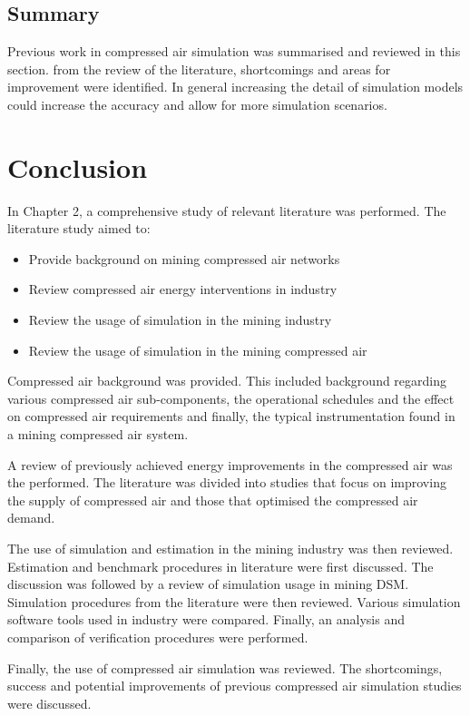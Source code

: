 	\subsection{Summary}\label{Shortcomings of previous work}
	Previous work in compressed air simulation was summarised and reviewed in this section. from the review of the literature, shortcomings and areas for improvement were identified. In general increasing the detail of simulation models could increase the accuracy and allow for more simulation scenarios.
\section{Conclusion}
In Chapter 2, a comprehensive study of relevant literature was performed. The literature study aimed to:
\begin{itemize}
	\item Provide background on mining compressed air networks
	\item Review compressed air energy interventions in industry
	\item Review the usage of simulation in the mining industry 
	\item Review the usage of simulation in the mining compressed air
\end{itemize}
Compressed air background was provided. This included background regarding various compressed air sub-components, the operational schedules and the effect on compressed air requirements and finally, the typical instrumentation found in a mining compressed air system.
\par
A review of previously achieved energy improvements in the compressed air was the performed. The literature was divided into studies that focus on improving the supply of compressed air and those that optimised the compressed air demand.
\par
The use of simulation and estimation in the mining industry was then reviewed. Estimation and benchmark procedures in literature were first discussed. The discussion was followed by a review of simulation usage in mining DSM. Simulation procedures from the literature were then reviewed. Various simulation software tools used in industry were compared. Finally, an analysis and comparison of verification procedures were performed.
\par 
	Finally, the use of compressed air simulation was reviewed.  The shortcomings, success and potential improvements of previous compressed air simulation studies were discussed.